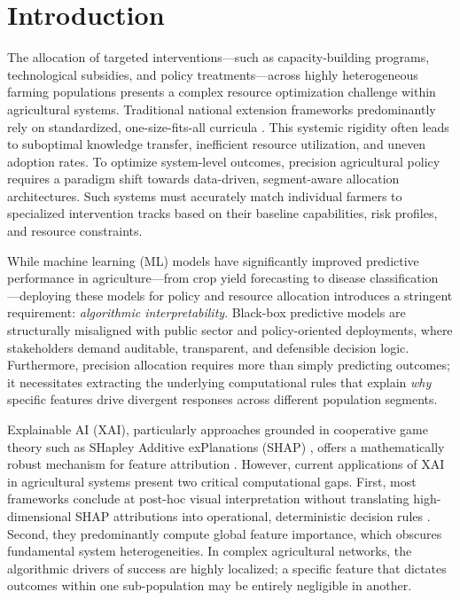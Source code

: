 \documentclass[3p,twocolumn,authoryear]{elsarticle}
\begin{document}

\section{Introduction}

The allocation of targeted interventions---such as capacity-building programs, technological subsidies, and policy treatments---across highly heterogeneous farming populations presents a complex resource optimization challenge within agricultural systems. Traditional national extension frameworks predominantly rely on standardized, one-size-fits-all curricula \citep{anderson2004,feder1985}. This systemic rigidity often leads to suboptimal knowledge transfer, inefficient resource utilization, and uneven adoption rates. To optimize system-level outcomes, precision agricultural policy requires a paradigm shift towards data-driven, segment-aware allocation architectures. Such systems must accurately match individual farmers to specialized intervention tracks based on their baseline capabilities, risk profiles, and resource constraints. 

While machine learning (ML) models have significantly improved predictive performance in agriculture---from crop yield forecasting to disease classification \citep{ghosal2018,kamilaris2018}---deploying these models for policy and resource allocation introduces a stringent requirement: \textit{algorithmic interpretability}. Black-box predictive models are structurally misaligned with public sector and policy-oriented deployments, where stakeholders demand auditable, transparent, and defensible decision logic. Furthermore, precision allocation requires more than simply predicting outcomes; it necessitates extracting the underlying computational rules that explain \textit{why} specific features drive divergent responses across different population segments. 

Explainable AI (XAI), particularly approaches grounded in cooperative game theory such as SHapley Additive exPlanations (SHAP) \citep{lundberg2017}, offers a mathematically robust mechanism for feature attribution \citep{arrieta2020,lundberg2020}. However, current applications of XAI in agricultural systems present two critical computational gaps. First, most frameworks conclude at post-hoc visual interpretation without translating high-dimensional SHAP attributions into operational, deterministic decision rules \citep{ryo2022,linardatos2021}. Second, they predominantly compute global feature importance, which obscures fundamental system heterogeneities. In complex agricultural networks, the algorithmic drivers of success are highly localized; a specific feature that dictates outcomes within one sub-population may be entirely negligible in another. 
\end{document}
